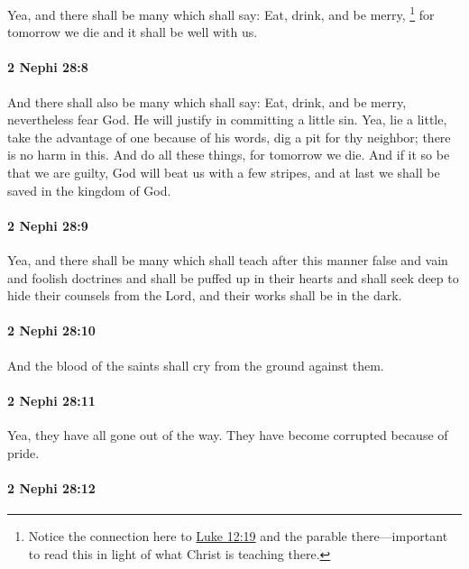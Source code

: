 			Yea, and there shall be many which shall say:
			Eat, drink, and be merry,%
				\footnote{%
					Notice the connection here to \hyperref[LUKE-12-19]{Luke 12:19} and the parable there---important to read this in light of what Christ is teaching there.
					}
			for tomorrow we die and it shall be well with us.

		\paragraph{2 Nephi 28:8} %
			\label{2NEPHI-28-8}

			And there shall also be many which shall say:
			Eat, drink, and be merry,
			nevertheless fear God.
			He will justify in committing a little sin.
			Yea, lie a little,
			take the advantage of one because of his words,
			dig a pit for thy neighbor;
			there is no harm in this.
			And do all these things, for tomorrow we die.
			And if it so be that we are guilty,
			God will beat us with a few stripes,
			and at last we shall be saved in the kingdom of God.

		\paragraph{2 Nephi 28:9} %
			\label{2NEPHI-28-9}

			Yea, and there shall be many
			which shall teach after this manner false and vain and foolish doctrines
			and shall be puffed up in their hearts
			and shall seek deep to hide their counsels from the Lord,
			and their works shall be in the dark.

		\paragraph{2 Nephi 28:10} %
			\label{2NEPHI-28-10}

			And the blood of the saints shall cry from the ground against them.

		\paragraph{2 Nephi 28:11} %
			\label{2NEPHI-28-11}

			Yea, they have all gone out of the way.
			They have become corrupted because of pride.

		\paragraph{2 Nephi 28:12} %
			\label{2NEPHI-28-12}

